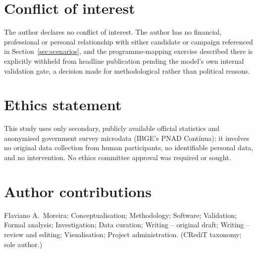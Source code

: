 \documentclass[11pt,a4paper]{article}
\begin{document}
\section*{Conflict of interest}
The author declares no conflict of interest. The author has no financial, professional or personal relationship with either candidate or campaign referenced in Section~\ref{sec:scenarios}, and the programme-mapping exercise described there is explicitly withheld from headline publication pending the model's own internal validation gate, a decision made for methodological rather than political reasons.

\section*{Ethics statement}
This study uses only secondary, publicly available official statistics and anonymised government survey microdata (IBGE's PNAD Cont\'inua); it involves no original data collection from human participants, no identifiable personal data, and no intervention. No ethics committee approval was required or sought.

\section*{Author contributions}
Flaviano A.\ Moreira: Conceptualisation; Methodology; Software; Validation; Formal analysis; Investigation; Data curation; Writing -- original draft; Writing -- review and editing; Visualisation; Project administration. (CRediT taxonomy; sole author.)

\end{document}
